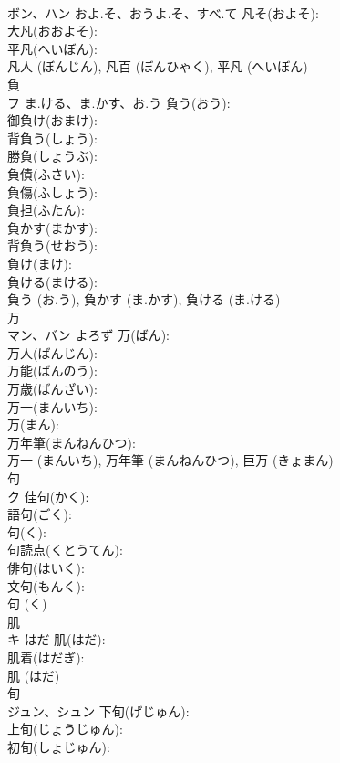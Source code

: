 \documentclass[8pt]{extreport}
\begin{document}
\begin{CJK}{UTF8}{min}
\\	ボン、ハン	およ.そ、おうよ.そ、すべ.て	凡そ(およそ): 
\\	大凡(おおよそ): 
\\	平凡(へいぼん): 
\\	凡人 (ぼんじん), 凡百 (ぼんひゃく), 平凡 (へいぼん)
\\	負			
\\	フ	ま.ける、ま.かす、お.う	負う(おう): 
\\	御負け(おまけ): 
\\	背負う(しょう): 
\\	勝負(しょうぶ): 
\\	負債(ふさい): 
\\	負傷(ふしょう): 
\\	負担(ふたん): 
\\	負かす(まかす): 
\\	背負う(せおう): 
\\	負け(まけ): 
\\	負ける(まける): 
\\	負う (お.う), 負かす (ま.かす), 負ける (ま.ける)
\\	万			
\\	マン、バン	よろず	万(ばん): 
\\	万人(ばんじん): 
\\	万能(ばんのう): 
\\	万歳(ばんざい): 
\\	万一(まんいち): 
\\	万(まん): 
\\	万年筆(まんねんひつ): 
\\	万一 (まんいち), 万年筆 (まんねんひつ), 巨万 (きょまん)
\\	句			
\\	ク		佳句(かく): 
\\	語句(ごく): 
\\	句(く): 
\\	句読点(くとうてん): 
\\	俳句(はいく): 
\\	文句(もんく): 
\\	句 (く)
\\	肌			
\\	キ	はだ	肌(はだ): 
\\	肌着(はだぎ): 
\\	肌 (はだ)
\\	旬			
\\	ジュン、シュン		下旬(げじゅん): 
\\	上旬(じょうじゅん): 
\\	初旬(しょじゅん): 

\end{CJK}
\end{document}
